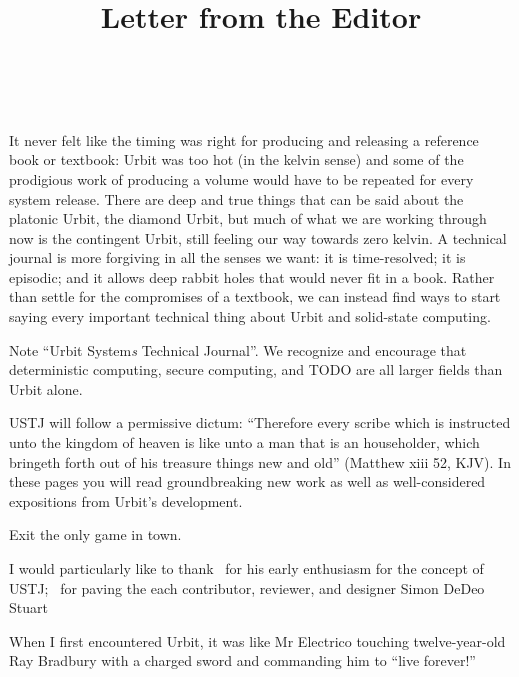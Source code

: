 \documentclass[twoside]{article}
\title{Letter from the Editor}
\author{\authorname~\authorpatp \\ \affiliation}
\date{}
\begin{document}
\maketitle
\thispagestyle{firststyle}

\setcounter{page}{1}

It never felt like the timing was right for producing and releasing a reference book or textbook:  Urbit was too hot (in the kelvin sense) and some of the prodigious work of producing a volume would have to be repeated for every system release.  There are deep and true things that can be said about the platonic Urbit, the diamond Urbit, but much of what we are working through now is the contingent Urbit, still feeling our way towards zero kelvin.  A technical journal is more forgiving in all the senses we want:  it is time-resolved; it is episodic; and it allows deep rabbit holes that would never fit in a book.  Rather than settle for the compromises of a textbook, we can instead find ways to start saying every important technical thing about Urbit and solid-state computing.

Note “Urbit System\emph{s} Technical Journal”.  We recognize and encourage that deterministic computing, secure computing, and TODO are all larger fields than Urbit alone.

USTJ will follow a permissive dictum:  “Therefore every scribe which is instructed unto the kingdom of heaven is like unto a man that is an householder, which bringeth forth out of his treasure things new and old” (Matthew xiii 52, KJV).  In these pages you will read groundbreaking new work as well as well-considered expositions from Urbit's development.

Exit the only game in town.

I would particularly like to thank ~for his early enthusiasm for the concept of USTJ; ~for paving the 
each contributor, reviewer, and designer
Simon DeDeo 
Stuart

When I first encountered Urbit, it was like Mr Electrico touching twelve-year-old Ray Bradbury with a charged sword and commanding him to “live forever!”
\end{document}
